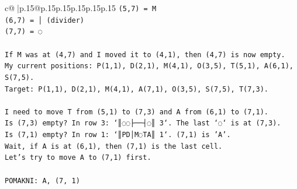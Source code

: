 \documentclass{article}
\begin{document}
{\begin{supertabular}{c@{$\;$}|p{.15\linewidth}@{}p{.15\linewidth}p{.15\linewidth}p{.15\linewidth}p{.15\linewidth}p{.15\linewidth}}
{{{\texttt{(5,7) = M} \\
\texttt{(6,7) = │ (divider)} \\
\texttt{(7,7) = ◌} \\
\\ 
\texttt{If M was at (4,7) and I moved it to (4,1), then (4,7) is now empty.} \\
\texttt{My current positions: P(1,1), D(2,1), M(4,1), O(3,5), T(5,1), A(6,1), S(7,5).} \\
\texttt{Target: P(1,1), D(2,1), M(4,1), A(7,1), O(3,5), S(7,5), T(7,3).} \\
\\ 
\texttt{I need to move T from (5,1) to (7,3) and A from (6,1) to (7,1).} \\
\texttt{Is (7,3) empty? In row 3: `║◌◌├──┤◌║ 3`. The last `◌` is at (7,3).} \\
\texttt{Is (7,1) empty? In row 1: `║PD│M◌TA║ 1`. (7,1) is 'A'.} \\
\texttt{Wait, if A is at (6,1), then (7,1) is the last cell.} \\
\texttt{Let's try to move A to (7,1) first.} \\
\\ 
\texttt{POMAKNI: A, (7, 1)} \\
            }
        }
    }
     \\ \\


\end{supertabular}}
\end{document}

